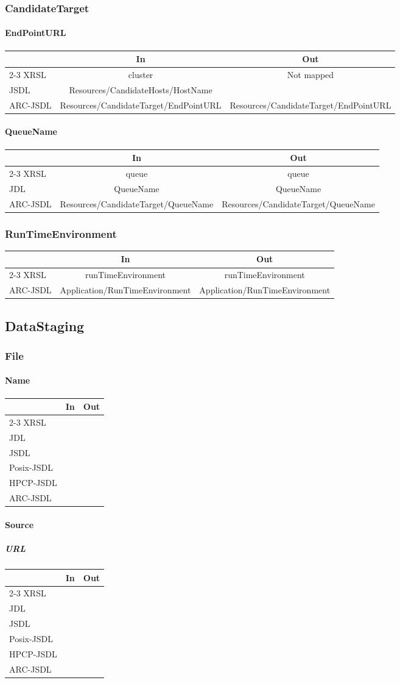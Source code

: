 \documentclass{article}
\newcommand{\subsubsubsection}[1]{\paragraph{#1}}
\newcommand{\subsubsubsubsection}[1]{\subparagraph{#1}}
\newenvironment{inouttabular}%
{\begin{center}\begin{tabular}{l>{\ttfamily\footnotesize}c>{\ttfamily\footnotesize}c}%
\toprule
& \textnormal{\normalsize{In}} & \textnormal{\normalsize{Out}}\\ \cmidrule{2-3}}
{\bottomrule\end{tabular}\end{center}}
\begin{document}
\subsubsection{CandidateTarget}
\subsubsubsection{EndPointURL}
\begin{inouttabular}
XRSL & cluster & Not mapped\\
JSDL & Resources/CandidateHosts/HostName &\\
ARC-JSDL & Resources/CandidateTarget/EndPointURL & Resources/CandidateTarget/EndPointURL\\
\end{inouttabular}

\subsubsubsection{QueueName}
\begin{inouttabular}
XRSL & queue & queue\\
JDL & QueueName & QueueName\\
ARC-JSDL & Resources/CandidateTarget/QueueName & Resources/CandidateTarget/QueueName\\
\end{inouttabular}

\subsubsection{RunTimeEnvironment}
\begin{inouttabular}
XRSL & runTimeEnvironment & runTimeEnvironment\\
ARC-JSDL & Application/RunTimeEnvironment & Application/RunTimeEnvironment\\
\end{inouttabular}

\subsection{DataStaging}
\subsubsection{File}
\subsubsubsection{Name}
\begin{inouttabular}
XRSL & &\\
JDL & &\\
JSDL & &\\
Posix-JSDL & &\\
HPCP-JSDL & &\\
ARC-JSDL & &\\
\end{inouttabular}

\subsubsubsection{Source}
\subsubsubsubsection{URL}
\begin{inouttabular}
XRSL & &\\
JDL & &\\
JSDL & &\\
Posix-JSDL & &\\
HPCP-JSDL & &\\
ARC-JSDL & &\\
\end{inouttabular}
\end{document}
